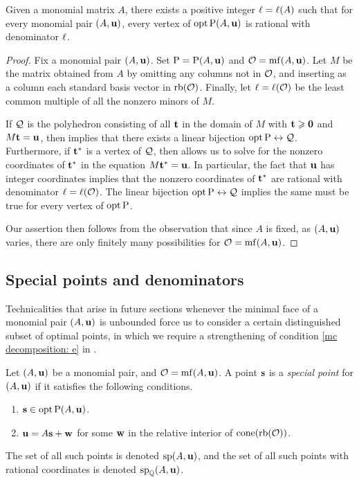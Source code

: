 \documentclass[11pt]{amsart}
\begin{document}
\begin{theorem}
\label{uniform denominators for vertices:  T}
Given a monomial matrix $A$, there exists a positive integer $\ell = \ell(A)$ such that for every monomial pair $(A, \mathbf{u})$, every vertex of $\operatorname{opt} \mathrm{P}(A, \mathbf{u})$ is rational with denominator $\ell$.
\end{theorem}

\begin{proof}
Fix a monomial pair $(A, \mathbf{u})$. Set $\mathrm{P} = \mathrm{P}(A, \mathbf{u})$ and $\mathcal{O} = \operatorname{mf}(A, \mathbf{u})$.  Let $M$ be the matrix obtained from $A$ by omitting any columns not in $\mathcal{O}$, and inserting as a column each standard basis vector in $\operatorname{rb}(\mathcal{O})$.  Finally, let $\ell = \ell(\mathcal{O})$ be the least common multiple of all the nonzero minors of $M$.

If $\mathcal{Q}$ is the polyhedron consisting of all $\mathbf{t}$ in the domain of $M$ with $\mathbf{t} \geqslant \mathbf{0}$ and $M \mathbf{t} = \mathbf{u}$, then  implies that there exists a linear bijection $\operatorname{opt} \mathrm{P}
\leftrightarrow \mathcal{Q}$.  Furthermore, if $\mathbf{t}^{\ast}$ is a vertex of $\mathcal{Q}$, then  allows us to solve for the nonzero coordinates of $\mathbf{t}^{\ast}$ in the equation $M \mathbf{t}^{\ast} = \mathbf{u}$.  In particular, the fact that $\mathbf{u}$ has integer coordinates implies that the nonzero coordinates of $\mathbf{t}^{\ast}$ are rational with denominator $\ell = \ell(\mathcal{O})$.  The linear bijection $\operatorname{opt} \mathrm{P} \leftrightarrow \mathcal{Q}$ implies the same must be true for every vertex of $\operatorname{opt} \mathrm{P}$.

Our assertion then follows from the observation that since $A$ is fixed, as $(A, \mathbf{u})$ varies, there are only finitely many possibilities for $\mathcal{O} = \operatorname{mf}(A, \mathbf{u})$.
\end{proof}

\subsection{Special points and denominators}

Technicalities that arise in future sections whenever the minimal face of a monomial pair $(A, \mathbf{u})$ is unbounded force us to consider a certain distinguished subset of optimal points, in which we require a strengthening of condition \eqref{mc decomposition: e} in .

\begin{definition}
\label{mc: D}
Let $(A,\mathbf{u})$ be a monomial pair, and $\mathcal{O} = \operatorname{mf}(A, \mathbf{u})$.  A point $\mathbf{s}$ is a \emph{special point} for $(A, \mathbf{u})$ if it satisfies the following conditions.
\begin{enumerate}
\item $\mathbf{s} \in \operatorname{opt} \mathrm{P}(A, \mathbf{u})$.
\item $\mathbf{u} = A \mathbf{s} + \mathbf{w}$ for some $\mathbf{w}$ in the relative interior of $\operatorname{cone} ( \operatorname{rb}(\mathcal{O}))$.
\end{enumerate}
The set of all such points is denoted $\operatorname{sp}(A, \mathbf{u})$, and the set of all such points with rational coordinates is denoted $\operatorname{sp}_{\mathbb{Q}}(A, \mathbf{u})$.
\end{definition}
\end{document}
